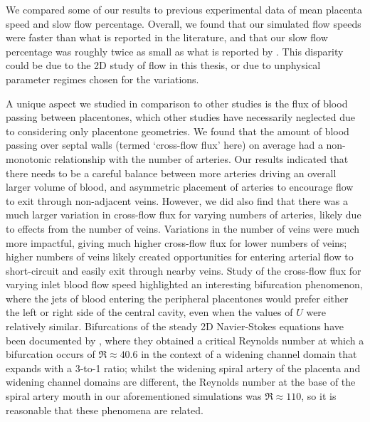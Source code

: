         We compared some of our results to previous experimental data of mean placenta speed and slow flow percentage. Overall, we found that our simulated flow speeds were faster than what is reported in the literature, and that our slow flow percentage was roughly twice as small as what is reported by \citeauthor{dellschaftHaemodynamicsHumanPlacenta2020} \cite{dellschaftHaemodynamicsHumanPlacenta2020}. This disparity could be due to the 2D study of flow in this thesis, or due to unphysical parameter regimes chosen for the variations.

        A unique aspect we studied in comparison to other studies is the flux of blood passing between placentones, which other studies have necessarily neglected due to considering only placentone geometries. We found that the amount of blood passing over septal walls (termed `cross-flow flux' here) on average had a non-monotonic relationship with the number of arteries. Our results indicated that there needs to be a careful balance between more arteries driving an overall larger volume of blood, and asymmetric placement of arteries to encourage flow to exit through non-adjacent veins. However, we did also find that there was a much larger variation in cross-flow flux for varying numbers of arteries, likely due to effects from the number of veins. Variations in the number of veins were much more impactful, giving much higher cross-flow flux for lower numbers of veins; higher numbers of veins likely created opportunities for entering arterial flow to short-circuit and easily exit through nearby veins. Study of the cross-flow flux for varying inlet blood flow speed highlighted an interesting bifurcation phenomenon, where the jets of blood entering the peripheral placentones would prefer either the left or right side of the central cavity, even when the values of $U$ were relatively similar. Bifurcations of the steady 2D Navier-Stokes equations have been documented by \citeauthor{cliffeAdaptivityPosterioriError2012} \cite{cliffeAdaptivityPosterioriError2012}, where they obtained a critical Reynolds number at which a bifurcation occurs of $\Re \approx 40.6$ in the context of a widening channel domain that expands with a 3-to-1 ratio; whilst the widening spiral artery of the placenta and widening channel domains are different, the Reynolds number at the base of the spiral artery mouth in our aforementioned simulations was $\Re \approx 110$, so it is reasonable that these phenomena are related.

